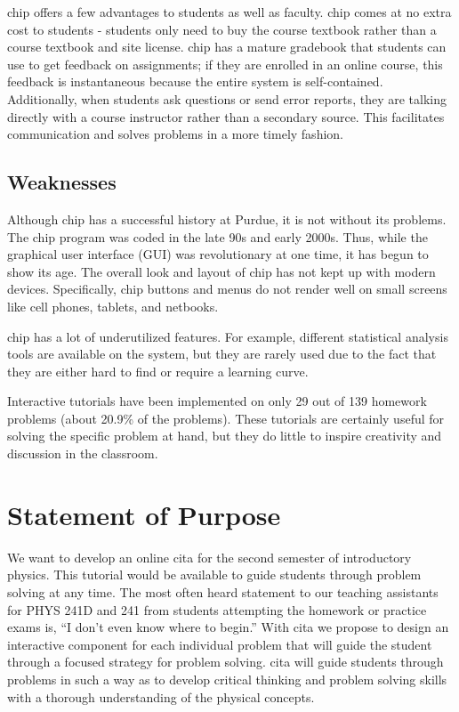 \gls{chip} offers a few advantages to students as well as faculty. \gls{chip} comes at no extra cost to students - students only need to buy the course textbook rather than a course textbook and site license. \gls{chip} has a mature gradebook that students can use to get feedback on assignments; if they are enrolled in an online course, this feedback is instantaneous because the entire system is self-contained. Additionally, when students ask questions or send error reports, they are talking directly with a course instructor rather than a secondary source. This facilitates communication and solves problems in a more timely fashion.

\subsection{Weaknesses}

Although \gls{chip} has a successful history at Purdue, it is not without its problems. The \gls{chip} program was coded in the late 90s and early 2000s. Thus, while the graphical user interface (GUI) was revolutionary at one time, it has begun to show its age. The overall look and layout of \gls{chip} has not kept up with modern devices. Specifically, \gls{chip} buttons and menus do not render well on small screens like cell phones, tablets, and netbooks.

\gls{chip} has a lot of underutilized features. For example, different statistical analysis tools are available on the system, but they are rarely used due to the fact that they are either hard to find or require a learning curve.

Interactive tutorials have been implemented on only 29 out of 139 homework problems (about 20.9\% of the problems). These tutorials are certainly useful for solving the specific problem at hand, but they do little to inspire creativity and discussion in the classroom.

\section{Statement of Purpose}

We want to develop an online \gls{cita} for the second semester of introductory physics. This tutorial would be available to guide students through problem solving at any time. The most often heard statement to our teaching assistants for PHYS 241D and 241 from students attempting the homework or practice exams is, ``I don’t even know where to begin.''  With \gls{cita} we propose to design an interactive component for each individual problem that will guide the student through a focused strategy for problem solving. \gls{cita} will guide students through problems in such a way as to develop critical thinking and problem solving skills with a thorough understanding of the physical concepts.

